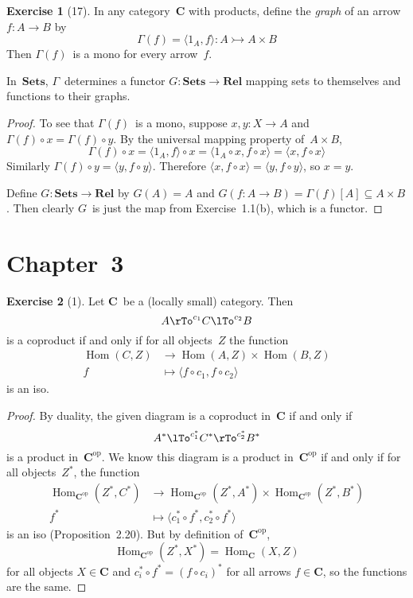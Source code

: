 \documentclass[letterpaper,12pt]{article}
\newcommand{\mono}{\rightarrowtail}
\newcommand{\after}{\circ}
\DeclareMathOperator{\Hom}{Hom}
\newcommand{\pair}[2]{\langle{#1},{#2}\rangle}
\renewcommand{\star}[1]{#1^{*}}
\newcommand{\cat}[1]{\mathbf{#1}}
\newcommand{\dual}[1]{#1^{\mathrm{op}}}
\newcommand{\C}{\cat{C}}
\newcommand{\Cop}{\dual{\C}}
\newcommand{\Rel}{\cat{Rel}}
\newcommand{\Sets}{\cat{Sets}}
\theoremstyle{definition}
\newtheorem*{exer}{Exercise}
\theoremstyle{remark}
\theoremstyle{direction}
\begin{document}
\begin{exer}[17]
In any category~\(\C\) with products, define the \emph{graph} of an arrow \(f:A\to B\) by
\[\Gamma(f)=\pair{1_A}{f}:A\mono A\times B\]
Then \(\Gamma(f)\)~is a mono for every arrow~\(f\).

In~\(\Sets\), \(\Gamma\)~determines a functor \(G:\Sets\to\Rel\) mapping sets to themselves and functions to their graphs.
\end{exer}
\begin{proof}
To see that \(\Gamma(f)\)~is a mono, suppose \(x,y:X\to A\) and \(\Gamma(f)\after x=\Gamma(f)\after y\). By the universal mapping property of~\(A\times B\),
\[\Gamma(f)\after x=\pair{1_A}{f}\after x=\pair{1_A\after x}{f\after x}=\pair{x}{f\after x}\]
Similarly \(\Gamma(f)\after y=\pair{y}{f\after y}\). Therefore \(\pair{x}{f\after x}=\pair{y}{f\after y}\), so \(x=y\).

Define \(G:\Sets\to\Rel\) by \(G(A)=A\) and \(G(f:A\to B)=\Gamma(f)[A]\subseteq A\times B\). Then clearly \(G\)~is just the map from Exercise~1.1(b), which is a functor.
\end{proof}

\section*{Chapter~3}
\begin{exer}[1]
Let \(\C\)~be a (locally small) category. Then
\[A\rTo^{c_1}C\lTo^{c_2}B\]
is a coproduct if and only if for all objects~\(Z\) the function
\begin{align*}
\Hom(C,Z)&\to\Hom(A,Z)\times\Hom(B,Z)\\
f&\mapsto\pair{f\after c_1}{f\after c_2}
\end{align*}
is an iso.
\end{exer}
\begin{proof}
By duality, the given diagram is a coproduct in~\(\C\) if and only if
\[\star{A}\lTo^{\star{c_1}}\star{C}\rTo^{\star{c_2}}\star{B}\]
is a product in~\(\Cop\). We know this diagram is a product in~\(\Cop\) if and only if for all objects~\(\star{Z}\), the function
\begin{align*}
\Hom_{\Cop}(\star{Z},\star{C})&\to\Hom_{\Cop}(\star{Z},\star{A})\times\Hom_{\Cop}(\star{Z},\star{B})\\
\star{f}&\mapsto\pair{\star{c_1}\after\star{f}}{\star{c_2}\after\star{f}}
\end{align*}
is an iso (Proposition~2.20). But by definition of~\(\Cop\),
\[\Hom_{\Cop}(\star{Z},\star{X})=\Hom_{\C}(X,Z)\]
for all objects \(X\in\C\) and \(\star{c_i}\after\star{f}=\star{(f\after c_i)}\) for all arrows \(f\in\C\), so the functions are the same.
\end{proof}
\end{document}
